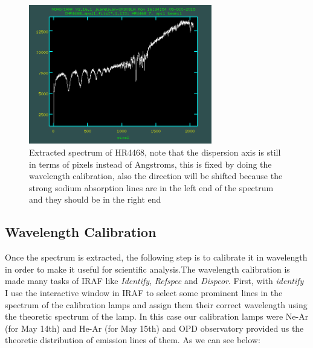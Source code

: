 \begin{figure}[H]
\centering
\includegraphics[width=8cm]{images/calib_star_apall.png}
\caption[Spectrum of calibration star HR4468]{Extracted spectrum of HR4468, note that the dispersion axis is still in terms of pixels instead of Angstroms, this is fixed by doing the wavelength calibration, also the direction will be shifted because the strong sodium absorption lines are in the left end of the spectrum and they should be in the right end}
\end{figure}

\subsection{Wavelength Calibration}

Once the spectrum is extracted, the following step is to calibrate it in wavelength in order to make it useful for scientific analysis.The wavelength calibration is made many tasks of IRAF like \textit{Identify}, \textit{Refspec} and \textit{Dispcor}. First, with \textit{identify} I use the interactive window in IRAF to select some prominent lines in the spectrum of the calibration lamps and assign them their correct wavelength using the theoretic spectrum of the lamp. In this case our calibration lamps were Ne-Ar (for May 14th) and He-Ar (for May 15th)  and OPD observatory provided us the theoretic distribution of emission lines of them. As we can see below:

